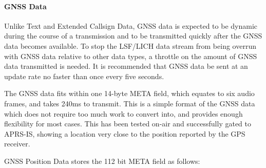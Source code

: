 \documentclass[a4paper,11pt,oneside]{book}
\begin{document}
\paragraph{GNSS Data}

Unlike Text and Extended Callsign Data, GNSS data is expected to be dynamic during the course of a transmission and to be transmitted quickly after the GNSS data becomes available. To stop the LSF/LICH data stream from being overrun with GNSS data relative to other data types, a throttle on the amount of GNSS data transmitted is needed. It is recommended that GNSS data be sent at an update rate no faster than once every five seconds.

The GNSS data fits within one 14-byte META field, which equates to six audio frames, and takes 240ms to transmit. This is a simple format of the GNSS data which does not require too much work to convert into, and provides enough flexibility for most cases. This has been tested on-air and successfully gated to APRS-IS, showing a location very close to the position reported by the GPS receiver.

GNSS Position Data stores the 112 bit META field as follows:
\end{document}

